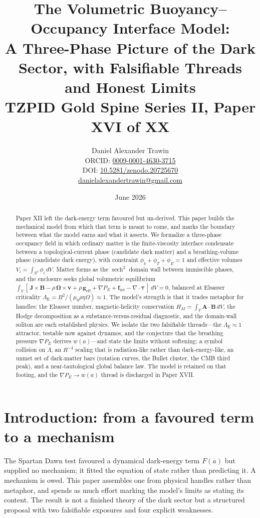 \documentclass[11pt]{article}
\title{The Volumetric Buoyancy--Occupancy Interface Model:\\ A Three-Phase Picture of the Dark Sector, with Falsifiable Threads and Honest Limits\\[0.6em]
\large TZPID Gold Spine Series II, Paper XVI of XX}
\author{Daniel Alexander Trawin\\
\small ORCID: \href{https://orcid.org/0009-0001-4630-3715}{0009-0001-4630-3715}\\
\small DOI: \href{https://doi.org/10.5281/zenodo.20725670}{10.5281/zenodo.20725670}\\
\small \href{mailto:danielalexandertrawin@gmail.com}{danielalexandertrawin@gmail.com}}
\date{June 2026}
\theoremstyle{remark}
\newcommand{\Els}{\Lambda_{\mathrm{E}}}
\begin{document}
\maketitle
\begin{abstract}
Paper XII left the dark-energy term favoured but un-derived. This paper builds the mechanical model from which that term is meant to come, and marks the boundary between what the model earns and what it asserts. We formalize a three-phase occupancy field in which ordinary matter is the finite-viscosity interface condensate between a topological-current phase (candidate dark matter) and a breathing-volume phase (candidate dark energy), with constraint $\phi_b + \phi_T + \phi_E = 1$ and effective volumes $V_i = \int_{S^3}\phi_i\,dV$. Matter forms as the $\operatorname{sech}^2$ domain wall between immiscible phases, and the enclosure seeks global volumetric equilibrium $\int_V[\,\mathbf{J}\times\mathbf{B} - \rho\,\bm{\Omega}\times\mathbf{v} + \rho\,\mathbf{g}_{\mathrm{eff}} + \nabla P_E + \mathbf{f}_{\mathrm{int}} - \nabla\!\cdot\bm{\tau}\,]\,dV = 0$, balanced at Elsasser criticality $\Els = B^2/(\mu_0\rho\eta\Omega) \approx 1$. The model's strength is that it trades metaphor for handles: the Elsasser number, magnetic-helicity conservation $H_M = \int_V \mathbf{A}\cdot\mathbf{B}\,dV$, the Hodge decomposition as a substance-versus-residual diagnostic, and the domain-wall soliton are each established physics. We isolate the two falsifiable threads---the $\Els \approx 1$ attractor, testable now against dynamos, and the conjecture that the breathing pressure $\nabla P_E$ derives $w(a)$---and state the limits without softening: a symbol collision on $\Lambda$, an $R^{-4}$ scaling that is radiation-like rather than dark-energy-like, an unmet set of dark-matter bars (rotation curves, the Bullet cluster, the CMB third peak), and a near-tautological global balance law. The model is retained on that footing, and the $\nabla P_E \to w(a)$ thread is discharged in Paper XVII.
\end{abstract}
\section{Introduction: from a favoured term to a mechanism}
The Spartan Dawn test favoured a dynamical dark-energy term $F(a)$ but supplied no mechanism; it fitted the equation of state rather than predicting it. A mechanism is owed. This paper assembles one from physical handles rather than metaphor, and spends as much effort marking the model's limits as stating its content. The result is not a finished theory of the dark sector but a structured proposal with two falsifiable exposures and four explicit weaknesses.
\end{document}
